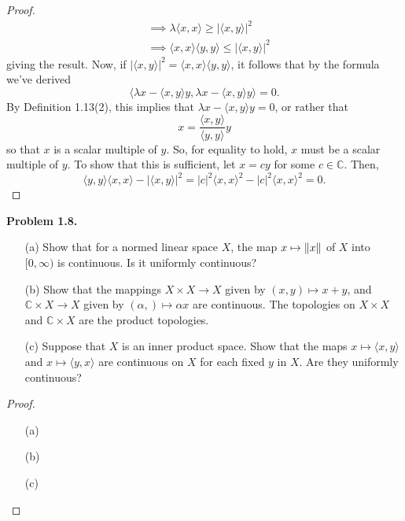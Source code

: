 \documentclass[12pt]{article}
\theoremstyle{definition}
\begin{document}
\begin{proof}
\begin{align*}
				&\implies \lambda \langle x, x \rangle \geq |\langle x, y \rangle|^2 \\
				&\implies \langle x, x \rangle \langle y, y \rangle \leq |\langle x, y \rangle|^2
			\end{align*}
		giving the result. Now, if $|\langle x, y \rangle|^2 = \langle x, x \rangle \langle y, y \rangle$, it follows that by the formula we've derived $$\langle \lambda x - \langle x, y \rangle y, \lambda x - \langle x, y \rangle y \rangle = 0.$$ By Definition 1.13(2), this implies that $\lambda x - \langle x, y \rangle y = 0$, or rather that $$x = \frac{\langle x, y \rangle}{\langle y, y\rangle} y$$ so that $x$ is a scalar multiple of $y$. So, for equality to hold, $x$ must be a scalar multiple of $y$. To show that this is sufficient, let $x = cy$ for some $c \in \mathbb{C}$. Then, $$\langle y, y \rangle \langle x, x \rangle - |\langle x, y \rangle|^2 = |c|^2 \langle x, x\rangle^2 - |c|^2 \langle x, x \rangle^2 = 0.$$ 
	\end{proof}

\newpage 
\noindent \textbf{Problem 1.8.} ~
	\begin{itemize}
		\item[(a)] Show that for a normed linear space $X$, the map $x \mapsto \norm{x}$ of $X$ into $[0, \infty)$ is continuous. Is it uniformly continuous?
		
		\item[(b)] Show that the mappings $X \times X \to X$ given by $(x, y) \mapsto x + y$, and $\mathbb{C} \times X \to X$ given by $(\alpha, ) \mapsto \alpha x$ are continuous. The topologies on $X \times X$ and $\mathbb{C} \times X$ are the product topologies.  
		
		\item[(c)] Suppose that $X$ is an inner product space. Show that the maps $x \mapsto \langle x, y\rangle$ and $x \mapsto \langle y, x\rangle$ are continuous on $X$ for each fixed $y$ in $X$. Are they uniformly continuous? 
	\end{itemize}
	\begin{proof} ~
		\begin{itemize}
			\item[(a)]
			
			\item[(b)]
			
			\item[(c)] 
		\end{itemize}
	\end{proof}
\end{document}
